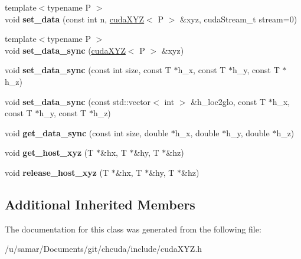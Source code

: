 \begin{DoxyCompactItemize}
\item 
\hypertarget{classcudaXYZ_a0926b6a6b35b460d6a10f8258eb3401c}{}\label{classcudaXYZ_a0926b6a6b35b460d6a10f8258eb3401c} 
{\footnotesize template$<$typename P $>$ }\\void {\bfseries set\+\_\+data} (const int n, \hyperlink{classcudaXYZ}{cuda\+X\+YZ}$<$ P $>$ \&xyz, cuda\+Stream\+\_\+t stream=0)
\item 
\hypertarget{classcudaXYZ_a4071a8a5f90628273d6b9ab2826ae7bc}{}\label{classcudaXYZ_a4071a8a5f90628273d6b9ab2826ae7bc} 
{\footnotesize template$<$typename P $>$ }\\void {\bfseries set\+\_\+data\+\_\+sync} (\hyperlink{classcudaXYZ}{cuda\+X\+YZ}$<$ P $>$ \&xyz)
\item 
\hypertarget{classcudaXYZ_a9bbf30196c2c456695743efc0c4d0ece}{}\label{classcudaXYZ_a9bbf30196c2c456695743efc0c4d0ece} 
void {\bfseries set\+\_\+data\+\_\+sync} (const int size, const T $\ast$h\+\_\+x, const T $\ast$h\+\_\+y, const T $\ast$h\+\_\+z)
\item 
\hypertarget{classcudaXYZ_a7b374a4e611a9f24e4a7176c2cb237e3}{}\label{classcudaXYZ_a7b374a4e611a9f24e4a7176c2cb237e3} 
void {\bfseries set\+\_\+data\+\_\+sync} (const std\+::vector$<$ int $>$ \&h\+\_\+loc2glo, const T $\ast$h\+\_\+x, const T $\ast$h\+\_\+y, const T $\ast$h\+\_\+z)
\item 
\hypertarget{classcudaXYZ_ad5159dae798dea4cf39531dc383f8708}{}\label{classcudaXYZ_ad5159dae798dea4cf39531dc383f8708} 
void {\bfseries get\+\_\+data\+\_\+sync} (const int size, double $\ast$h\+\_\+x, double $\ast$h\+\_\+y, double $\ast$h\+\_\+z)
\item 
\hypertarget{classcudaXYZ_a6f8381bc6b76f10d827733ba12da74d1}{}\label{classcudaXYZ_a6f8381bc6b76f10d827733ba12da74d1} 
void {\bfseries get\+\_\+host\+\_\+xyz} (T $\ast$\&hx, T $\ast$\&hy, T $\ast$\&hz)
\item 
\hypertarget{classcudaXYZ_a9093eafba4c48b8c8d92a7072392231e}{}\label{classcudaXYZ_a9093eafba4c48b8c8d92a7072392231e} 
void {\bfseries release\+\_\+host\+\_\+xyz} (T $\ast$\&hx, T $\ast$\&hy, T $\ast$\&hz)
\end{DoxyCompactItemize}
\subsection*{Additional Inherited Members}


The documentation for this class was generated from the following file\+:\begin{DoxyCompactItemize}
\item 
/u/samar/\+Documents/git/chcuda/include/cuda\+X\+Y\+Z.\+h\end{DoxyCompactItemize}
